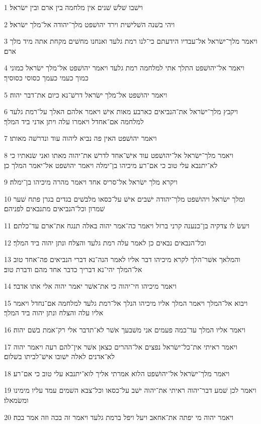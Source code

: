 \par 1 וישׁבו שׁלשׁ שׁנים אין מלחמה בין ארם ובין ישׂראל׃
\par 2 ויהי בשׁנה השׁלישׁית וירד יהושׁפט מלך־יהודה אל־מלך ישׂראל׃
\par 3 ויאמר מלך־ישׂראל אל־עבדיו הידעתם כי־לנו רמת גלעד ואנחנו מחשׁים מקחת אתה מיד מלך ארם׃
\par 4 ויאמר אל־יהושׁפט התלך אתי למלחמה רמת גלעד ויאמר יהושׁפט אל־מלך ישׂראל כמוני כמוך כעמי כעמך כסוסי כסוסיך׃
\par 5 ויאמר יהושׁפט אל־מלך ישׂראל דרשׁ־נא כיום את־דבר יהוה׃
\par 6 ויקבץ מלך־ישׂראל את־הנביאים כארבע מאות אישׁ ויאמר אלהם האלך על־רמת גלעד למלחמה אם־אחדל ויאמרו עלה ויתן אדני ביד המלך׃
\par 7 ויאמר יהושׁפט האין פה נביא ליהוה עוד ונדרשׁה מאותו׃
\par 8 ויאמר מלך־ישׂראל אל־יהושׁפט עוד אישׁ־אחד לדרשׁ את־יהוה מאתו ואני שׂנאתיו כי לא־יתנבא עלי טוב כי אם־רע מיכיהו בן־ימלה ויאמר יהושׁפט אל־יאמר המלך כן׃
\par 9 ויקרא מלך ישׂראל אל־סריס אחד ויאמר מהרה מיכיהו בן־ימלה׃
\par 10 ומלך ישׂראל ויהושׁפט מלך־יהודה ישׁבים אישׁ על־כסאו מלבשׁים בגדים בגרן פתח שׁער שׁמרון וכל־הנביאים מתנבאים לפניהם׃
\par 11 ויעשׂ לו צדקיה בן־כנענה קרני ברזל ויאמר כה־אמר יהוה באלה תנגח את־ארם עד־כלתם׃
\par 12 וכל־הנבאים נבאים כן לאמר עלה רמת גלעד והצלח ונתן יהוה ביד המלך׃
\par 13 והמלאך אשׁר־הלך לקרא מיכיהו דבר אליו לאמר הנה־נא דברי הנביאים פה־אחד טוב אל־המלך יהי־נא דבריך כדבר אחד מהם ודברת טוב׃
\par 14 ויאמר מיכיהו חי־יהוה כי את־אשׁר יאמר יהוה אלי אתו אדבר׃
\par 15 ויבוא אל־המלך ויאמר המלך אליו מיכיהו הנלך אל־רמת גלעד למלחמה אם־נחדל ויאמר אליו עלה והצלח ונתן יהוה ביד המלך׃
\par 16 ויאמר אליו המלך עד־כמה פעמים אני משׁבעך אשׁר לא־תדבר אלי רק־אמת בשׁם יהוה׃
\par 17 ויאמר ראיתי את־כל־ישׂראל נפצים אל־ההרים כצאן אשׁר אין־להם רעה ויאמר יהוה לא־אדנים לאלה ישׁובו אישׁ־לביתו בשׁלום׃
\par 18 ויאמר מלך־ישׂראל אל־יהושׁפט הלוא אמרתי אליך לוא־יתנבא עלי טוב כי אם־רע׃
\par 19 ויאמר לכן שׁמע דבר־יהוה ראיתי את־יהוה ישׁב על־כסאו וכל־צבא השׁמים עמד עליו מימינו ומשׂמאלו׃
\par 20 ויאמר יהוה מי יפתה את־אחאב ויעל ויפל ברמת גלעד ויאמר זה בכה וזה אמר בכה׃
